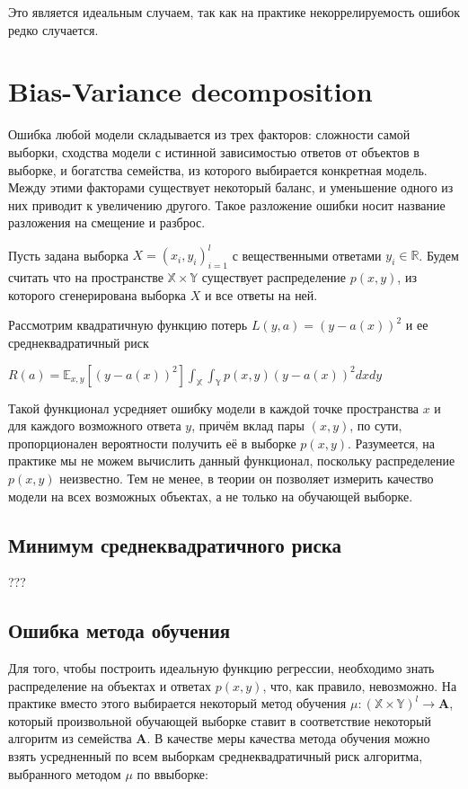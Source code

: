 \documentclass{article}
\theoremstyle{definition}
\theoremstyle{theorem}
\theoremstyle{remark}
\theoremstyle{theorem}
\theoremstyle{example}
\theoremstyle{theorem}
\theoremstyle{theorem}
\theoremstyle{theorem}
\theoremstyle{theorem}
\begin{document}
Это является идеальным случаем, так как на практике некоррелируемость ошибок редко случается.

\section{Bias-Variance decomposition}

Ошибка любой модели складывается из трех факторов: сложности самой выборки, сходства модели с истинной зависимостью ответов от объектов в выборке, и богатства семейства, из которого выбирается конкретная модель. Между этими факторами существует некоторый баланс, и уменьшение одного из них приводит к увеличению другого. Такое разложение ошибки носит название разложения на смещение и разброс.

Пусть задана выборка $X = (x_i,y_i)^l_{i=1}$ с вещественными ответами $y_i \in \mathbb{R}$. Будем считать что на пространстве $\mathbb{X} \times \mathbb{Y}$ существует распределение $p(x,y)$, из которого сгенерирована выборка $X$ и все ответы на ней.

Рассмотрим квадратичную функцию потерь $L(y,a) = (y-a(x))^2$ и ее среднеквадратичный риск

$R(a) = \mathbb{E}_{x,y}\left[(y-a(x))^2\right] \int_{\mathbb{X}}\int_{\mathbb{Y}} p(x,y)(y-a(x))^2dxdy$

Такой функционал усредняет ошибку модели в каждой точке пространства $x$ и для каждого возможного ответа $y$, причём вклад пары $(x, y)$, по сути, пропорционален вероятности получить её в выборке $p(x, y)$. Разумеется, на практике мы не можем вычислить данный функционал, поскольку распределение $p(x, y)$ неизвестно. Тем не менее, в теории он позволяет измерить качество модели на всех возможных объектах, а не только на обучающей выборке.

\subsection{Минимум среднеквадратичного риска}

???

\subsection{Ошибка метода обучения}

Для того, чтобы построить идеальную функцию регрессии, необходимо знать распределение на объектах и ответах $p(x, y)$, что, как правило, невозможно. На практике вместо этого выбирается некоторый метод обучения $\mu : (\mathbb{X}\times\mathbb{Y})^l \rightarrow \mathbf{A}$, который произвольной обучающей выборке ставит в соответствие некоторый алгоритм из семейства $\mathbf{A}$. В качестве меры качества метода обучения можно взять усредненный
по всем выборкам среднеквадратичный риск алгоритма, выбранного методом $\mu$ по ввыборке:
\end{document}
